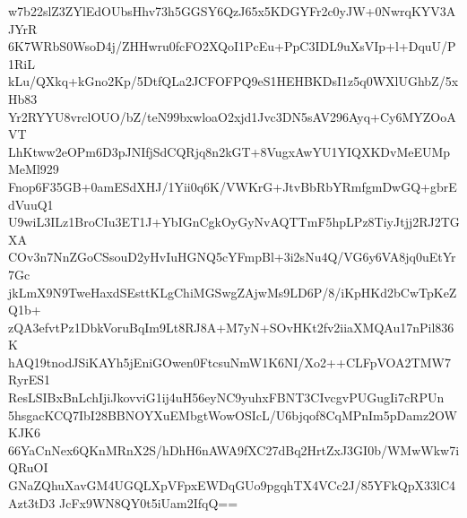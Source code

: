 w7b22slZ3ZYlEdOUbsHhv73h5GGSY6QzJ65x5KDGYFr2c0yJW+0NwrqKYV3AJYrR
6K7WRbS0WsoD4j/ZHHwru0fcFO2XQoI1PcEu+PpC3IDL9uXsVIp+l+DquU/P1RiL
kLu/QXkq+kGno2Kp/5DtfQLa2JCFOFPQ9eS1HEHBKDsI1z5q0WXlUGhbZ/5xHb83
Yr2RYYU8vrclOUO/bZ/teN99bxwloaO2xjd1Jvc3DN5sAV296Ayq+Cy6MYZOoAVT
LhKtww2eOPm6D3pJNIfjSdCQRjq8n2kGT+8VugxAwYU1YIQXKDvMeEUMpMeMl929
Fnop6F35GB+0amESdXHJ/1Yii0q6K/VWKrG+JtvBbRbYRmfgmDwGQ+gbrEdVuuQ1
U9wiL3ILz1BroCIu3ET1J+YbIGnCgkOyGyNvAQTTmF5hpLPz8TiyJtjj2RJ2TGXA
COv3n7NnZGoCSsouD2yHvIuHGNQ5cYFmpBl+3i2sNu4Q/VG6y6VA8jq0uEtYr7Gc
jkLmX9N9TweHaxdSEsttKLgChiMGSwgZAjwMs9LD6P/8/iKpHKd2bCwTpKeZQ1b+
zQA3efvtPz1DbkVoruBqIm9Lt8RJ8A+M7yN+SOvHKt2fv2iiaXMQAu17nPil836K
hAQ19tnodJSiKAYh5jEniGOwen0FtcsuNmW1K6NI/Xo2++CLFpVOA2TMW7RyrES1
ResLSIBxBnLchIjiJkovviG1ij4uH56eyNC9yuhxFBNT3CIvcgvPUGugIi7cRPUn
5hsgacKCQ7IbI28BBNOYXuEMbgtWowOSIcL/U6bjqof8CqMPnIm5pDamz2OWKJK6
66YaCnNex6QKnMRnX2S/hDhH6nAWA9fXC27dBq2HrtZxJ3GI0b/WMwWkw7iQRuOI
GNaZQhuXavGM4UGQLXpVFpxEWDqGUo9pgqhTX4VCc2J/85YFkQpX33lC4Azt3tD3
JcFx9WN8QY0t5iUam2IfqQ==
